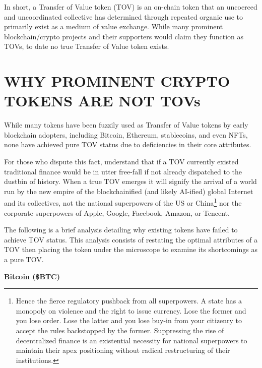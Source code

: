 \documentclass{article}
\begin{document}
In short, a Transfer of Value token (TOV) is an on-chain token that an uncoerced and uncoordinated collective has determined through repeated organic use to primarily exist as a medium of value exchange. While many prominent blockchain/crypto projects and their supporters would claim they function as TOVs, to date no true Transfer of Value token exists.

\section*{WHY PROMINENT CRYPTO TOKENS ARE NOT TOVs}

While many tokens have been fuzzily used as Transfer of Value tokens by early blockchain adopters, including Bitcoin, Ethereum, stablecoins, and even NFTs, none have achieved pure TOV status due to deficiencies in their core attributes.

For those who dispute this fact, understand that if a TOV currently existed traditional finance would be in utter free-fall if not already dispatched to the dustbin of history. When a true TOV emerges it will signify the arrival of a world run by the new empire of the blockchainified (and likely AI-ified) global Internet and its collectives, not the national superpowers of the US or China\footnote{Hence the fierce regulatory pushback from all superpowers. A state has a monopoly on violence and the right to issue currency. Lose the former and you lose order. Lose the latter and you lose buy-in from your citizenry to accept the rules backstopped by the former. Suppressing the rise of decentralized finance is an existential necessity for national superpowers to maintain their apex positioning without radical restructuring of their institutions.} nor the corporate superpowers of Apple, Google, Facebook, Amazon, or Tencent.

The following is a brief analysis detailing why existing tokens have failed to achieve TOV status. This analysis consists of restating the optimal attributes of a TOV then placing the token under the microscope to examine its shortcomings as a pure TOV.

\textbf{Bitcoin (\$BTC)}
\end{document}
